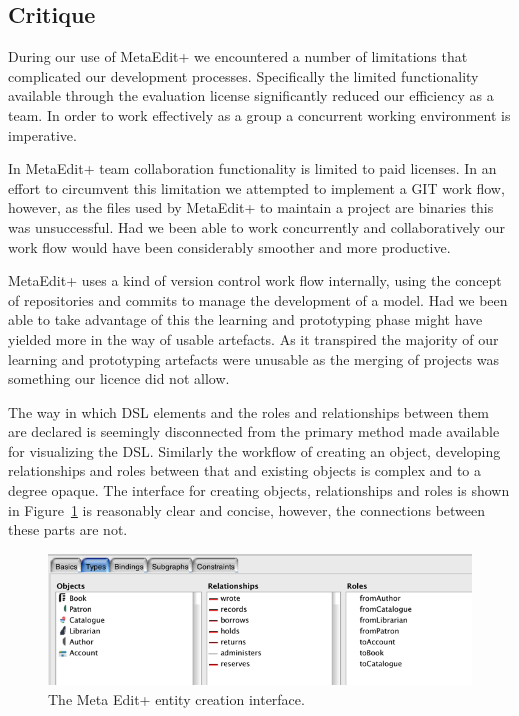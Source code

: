 \subsection{Critique}
During our use of MetaEdit+ we encountered a number of limitations that complicated our development processes. Specifically the limited functionality available through the evaluation license significantly reduced our efficiency as a team. In order to work effectively as a group a concurrent working environment is imperative.\par
In MetaEdit+ team collaboration functionality is limited to paid licenses. In an effort to circumvent this limitation we attempted to implement a GIT work flow, however, as the files used by MetaEdit+ to maintain a project are binaries this was unsuccessful. Had we been able to work concurrently and collaboratively our work flow would have been considerably smoother and more productive.\par
MetaEdit+ uses a kind of version control work flow internally, using the concept of repositories and commits to manage the development of a model. Had we been able to take advantage of this the learning and prototyping phase might have yielded more in the way of usable artefacts. As it transpired the majority of our learning and prototyping artefacts were unusable as the merging of projects was something our licence did not allow.

The way in which DSL elements and the roles and relationships between them are declared is seemingly disconnected from the primary method made available for visualizing the DSL. Similarly the workflow of creating an object, developing relationships and roles between that and existing objects is complex and to a degree opaque. The interface for creating objects, relationships and roles is shown in Figure~\ref{fig:objcreate} is reasonably clear and concise, however, the connections between these parts are not. 

\begin{figure}
  \centering
  \includegraphics[scale=0.6]{images/entity_creation.png}
  \caption{The Meta Edit+ entity creation interface.}
  \label{fig:objcreate}
\end{figure}

